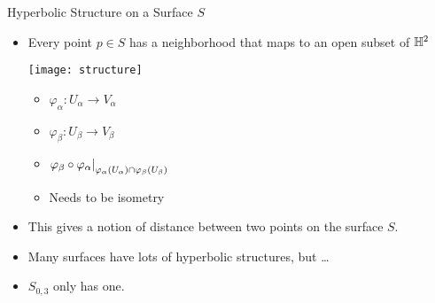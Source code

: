 \documentclass{beamer}
\begin{document}
	\begin{frame}{Hyperbolic Structure on a Surface $S$}
		\begin{itemize}
			\item Every point $p \in S$ has a neighborhood that maps to an open subset of $\mathbb{H}^2$
			\begin{center}
				\begin{multicols}{2}
					\begin{minipage}{0.5\textwidth}
						\texttt{[image: structure]}
					\end{minipage}
					\begin{minipage}{0.5\textwidth}
						\begin{itemize}
							\item $\varphi_\alpha \colon U_\alpha \to V_\alpha$
							\item $\varphi_\beta \colon U_\beta \to V_\beta$
							\item $\restrict{\varphi_\beta \circ \varphi_\alpha}{\varphi_\alpha(U_\alpha) \cap \varphi_\beta(U_\beta)}$
							\item Needs to be isometry
						\end{itemize}
					\end{minipage}	
				\end{multicols}
			\end{center}
			\item This gives a notion of distance between two points on the surface $S$.
			\item Many surfaces have lots of hyperbolic structures, but \dots 
			\item $S_{0,3}$ only has one.
		\end{itemize}
	\end{frame}
\end{document}
